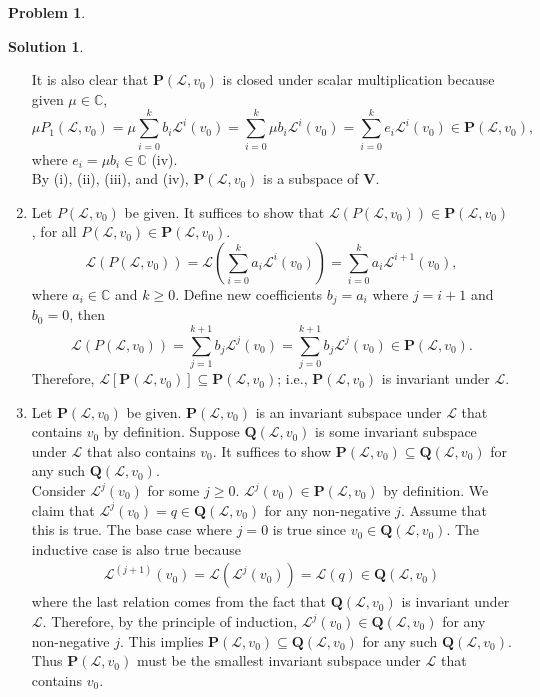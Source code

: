 \documentclass{book}
\theoremstyle{definition}
\newtheorem*{prob*}{Problem}
\newtheorem*{sln*}{Solution}
\newcommand{\V}{\mathbf{V}}
\newcommand{\lag}{\mathcal{L}}
\begin{document}
\begin{prob*}
\begin{sln*}
\begin{enumerate}
			It is also clear that $\mathbf{P}(\lag,v_0)$ is closed under scalar multiplication because given $\mu\in \mathbb{C}$, $$\mu P_1(\lag,v_0) = \mu\sum_{i=0}^kb_i\lag^i(v_0) = \sum_{i=0}^k\mu b_i\lag^i(v_0) = \sum_{i=0}^ke_i\lag^i(v_0) \in \mathbf{P}(\lag,v_0),$$ where $e_i = \mu b_i \in \mathbb{C}$ (iv).\\
			
			By (i), (ii), (iii), and (iv), $\mathbf{P}(\lag,v_0)$ is a subspace of $\V$. \\
			
			
			\item Let $P(\lag,v_0)$ be given. It suffices to show that $\lag(P(\lag, v_0)) \in \mathbf{P}(\lag,v_0)$, for all $P(\lag,v_0) \in \mathbf{P}(\lag,v_0)$. $$ \lag(P(\lag,v_0)) = \lag\left( \sum_{i=0}^k a_i\lag^i(v_0) \right) = \sum_{i=0}^k a_i \lag^{i+1}(v_0),$$ where $a_i\in\mathbb{C}$ and $k\geq 0$. Define new coefficients $b_{j} = a_{i}$ where $j=i+1$ and $b_0 = 0$, then $$ \lag(P(\lag,v_0)) = \sum_{j=1}^{k+1} b_j\lag^j(v_0) = \sum_{j=0}^{k+1} b_j\lag^j(v_0) \in \mathbf{P}(\lag,v_0). $$
			Therefore, $\lag\left[\mathbf{P}(\lag,v_0) \right] \subseteq \mathbf{P}(\lag,v_0)$; i.e., $\mathbf{P}(\lag,v_0)$ is invariant under $\lag$. \\
			
			
			
			\item  Let $\mathbf{P}(\lag,v_0)$ be given. $\mathbf{P}(\lag,v_0)$ is an invariant subspace under $\lag$ that contains $v_0$ by definition. Suppose $\mathbf{Q}(\lag,v_0)$ is some invariant subspace under $\lag$ that also contains $v_0$. It suffices to show $\mathbf{P}(\lag,v_0) \subseteq \mathbf{Q}(\lag,v_0)$ for any such $\mathbf{Q}(\lag,v_0)$. \\
			
			Consider $\lag^j(v_0)$ for some $j\geq 0$. $\lag^j{(v_0)}\in \mathbf{P}(\lag,v_0)$ by definition. We claim that $\lag^j(v_0) = q\in \mathbf{Q}(\lag,v_0)$ for any non-negative $j$. Assume that this is true. The base case where $j=0$ is true since $v_0 \in \mathbf{Q}(\lag,v_0)$. The inductive case is also true because
			\begin{align*}
			\lag^{(j+1)}(v_0) = \lag(\lag^j(v_0)) = \lag(q) \in \mathbf{Q}(\lag,v_0) 
			\end{align*}
			where the last relation comes from the fact that $\mathbf{Q}(\lag,v_0)$ is invariant under $\lag$. Therefore, by the principle of induction, $\lag^j(v_0) \in \mathbf{Q}(\lag,v_0)$ for any non-negative $j$. This implies $\mathbf{P}(\lag,v_0) \subseteq \mathbf{Q}(\lag,v_0)$ for any such $\mathbf{Q}(\lag,v_0)$. Thus $\mathbf{P}(\lag,v_0)$ must be the smallest invariant subspace under $\lag$ that contains $v_0$. 
			

\end{enumerate}
\end{sln*}
\end{prob*}
\end{document}
